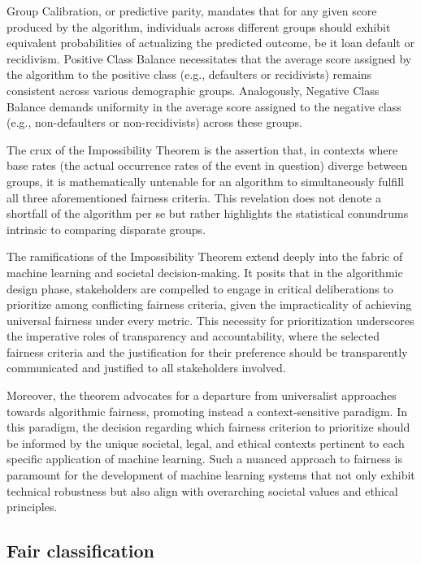 \cite{Saravanakumar2017,Bell2023,Beigang2023}

Group Calibration, or predictive parity, mandates that for any given score produced by the algorithm, individuals across different groups should exhibit equivalent probabilities of actualizing the predicted outcome, be it loan default or recidivism. Positive Class Balance necessitates that the average score assigned by the algorithm to the positive class (e.g., defaulters or recidivists) remains consistent across various demographic groups. Analogously, Negative Class Balance demands uniformity in the average score assigned to the negative class (e.g., non-defaulters or non-recidivists) across these groups.

The crux of the Impossibility Theorem is the assertion that, in contexts where base rates (the actual occurrence rates of the event in question) diverge between groups, it is mathematically untenable for an algorithm to simultaneously fulfill all three aforementioned fairness criteria. This revelation does not denote a shortfall of the algorithm per se but rather highlights the statistical conundrums intrinsic to comparing disparate groups.

The ramifications of the Impossibility Theorem extend deeply into the fabric of machine learning and societal decision-making. It posits that in the algorithmic design phase, stakeholders are compelled to engage in critical deliberations to prioritize among conflicting fairness criteria, given the impracticality of achieving universal fairness under every metric. This necessity for prioritization underscores the imperative roles of transparency and accountability, where the selected fairness criteria and the justification for their preference should be transparently communicated and justified to all stakeholders involved.

Moreover, the theorem advocates for a departure from universalist approaches towards algorithmic fairness, promoting instead a context-sensitive paradigm. In this paradigm, the decision regarding which fairness criterion to prioritize should be informed by the unique societal, legal, and ethical contexts pertinent to each specific application of machine learning. Such a nuanced approach to fairness is paramount for the development of machine learning systems that not only exhibit technical robustness but also align with overarching societal values and ethical principles.

\subsection{Fair classification}

